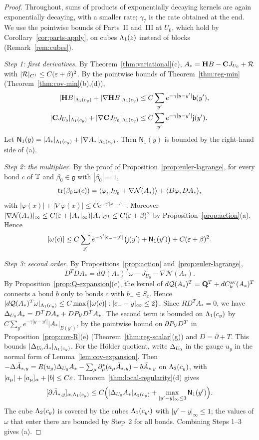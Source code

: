 \begin{proof}
Throughout, sums of products of exponentially decaying kernels are again exponentially decaying, with a smaller rate; $\gamma_7$ is the rate obtained at the end. We use the pointwise bounds of Parts~II and~III at $U_0$, which hold by Corollary~\ref{cor:parts-apply}, on cubes $\Lambda_1(z)$ instead of blocks (Remark~\ref{rem:cubes}).

\emph{Step 1: first derivatives.} By Theorem~\ref{thm:variational}(c), $A_*=\mathbf H B-\mathbf C J_{U_0}+\mathcal R$ with $|\mathcal R|_{C^1}\le C(\varepsilon+\beta)^2$. By the pointwise bounds of Theorem~\ref{thm:reg-min} (Theorem~\ref{thm:cov-min}(b),(d)),
\[
\begin{aligned}
|\mathbf H B|_{\Lambda_1(c_y)}+|\nabla\mathbf H B|_{\Lambda_1(c_y)}&\le C\sum_{y'}e^{-\gamma|y-y'|}\mathsf b(y'),\\
|\mathbf C J_{U_0}|_{\Lambda_1(c_y)}+|\nabla\mathbf C J_{U_0}|_{\Lambda_1(c_y)}&\le C\sum_{y'}e^{-\gamma|y-y'|}\mathsf j(y').
\end{aligned}
\]
Let $\mathsf N_1(y)=|A_*|_{\Lambda_1(c_y)}+|\nabla A_*|_{\Lambda_1(c_y)}$. Then $\mathsf N_1(y)$ is bounded by the right-hand side of (a).

\emph{Step 2: the multiplier.} By the proof of Proposition~\ref{prop:euler-lagrange}, for every bond $c$ of $\mathbb T$ and $\beta_0\in\mathfrak g$ with $|\beta_0|=1$,
\[
\operatorname{tr}(\beta_0\,\omega(c))=\langle \varphi,J_{U_0}+\nabla\mathcal N(A_*)\rangle+\langle D\varphi,DA_*\rangle,
\]
with $|\varphi(x)|+|\nabla\varphi(x)|\le Ce^{-\gamma'|x-c_-|}$. Moreover $|\nabla\mathcal N(A_*)|_\infty\le C(\varepsilon+|A_*|_\infty)|A_*|_{C^1}\le C(\varepsilon+\beta)^2$ by Proposition~\ref{prop:action}(a). Hence
\[
|\omega(c)|\le C\sum_{y'}e^{-\gamma'|c_--y'|}\big(\mathsf j(y')+\mathsf N_1(y')\big)+C(\varepsilon+\beta)^2 .
\]

\emph{Step 3: second order.} By Propositions~\ref{prop:action} and~\ref{prop:euler-lagrange},
\[
D^TDA_*=d\mathcal Q(A_*)^T\omega-J_{U_0}-\nabla\mathcal N(A_*).
\]
By Proposition~\ref{prop:Q-expansion}(c), the kernel of $d\mathcal Q(A_*)^T=\mathbf Q^T+dC^{\rm av}_k(A_*)^T$ connects a bond $b$ only to bonds $c$ with $b_-\in S_c$. Hence $|d\mathcal Q(A_*)^T\omega|_{\Lambda_1(c_y)}\le C\max\{|\omega(c)|:|c_--y|_\infty\le2\}$. Since $RD^TA_*=0$, we have $\Delta_{U_0}A_*=D^TDA_*+DP_\mathcal V D^TA_*$. The second term is bounded on $\Lambda_1(c_y)$ by $C\sum_{y'}e^{-\gamma|y-y'|}|A_*|_{B(y')}$, by the pointwise bound on $\partial P_\mathcal V D^T$ in Proposition~\ref{prop:cov-R}(e) (Theorem~\ref{thm:reg-scalar}(g)) and $D=\partial+T$. This bounds $|\Delta_{U_0}A_*|_{\Lambda_1(c_y)}$. For the H\"older quotient, write $\Delta_{U_0}$ in the gauge $u_y$ in the normal form of Lemma~\ref{lem:cov-expansion}. Then $-\Delta\tilde A_{*,y}=R(u_y)\Delta_{U_0}A_*-\sum_\mu\partial^*_\mu(a_\mu\tilde A_{*,y})-b\tilde A_{*,y}$ on $\Lambda_3(c_y)$, with $|a_\mu|+[a_\mu]_\alpha+|b|\le C\varepsilon$. Theorem~\ref{thm:local-regularity}(d) gives
\[
[\partial\tilde A_{*,y}]_{\alpha,\Lambda_1(c_y)}\le C\Big(|\Delta_{U_0}A_*|_{\Lambda_2(c_y)}+\max_{|y'-y|_\infty\le3}\mathsf N_1(y')\Big).
\]
The cube $\Lambda_2(c_y)$ is covered by the cubes $\Lambda_1(c_{y'})$ with $|y'-y|_\infty\le1$; the values of $\omega$ that enter there are bounded by Step~2 for all bonds. Combining Steps 1--3 gives (a).


\end{proof}
